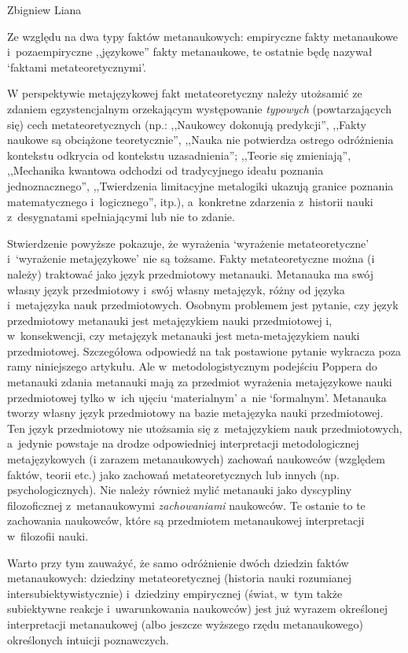 \begin{artplenv}{Zbigniew Liana}
\begin{uwaga}
Ze względu na dwa typy faktów metanaukowych: empiryczne fakty metanaukowe i~pozaempiryczne ,,językowe'' fakty metanaukowe,
te ostatnie będę nazywał `faktami metateoretycznymi'.

W perspektywie metajęzykowej fakt metateoretyczny należy utożsamić ze zdaniem egzystencjalnym orzekającym występowanie
\textit{typowych} (powtarzających się) cech metateoretycznych (np.: ,,Naukowcy dokonują predykcji'', ,,Fakty naukowe są
obciążone teoretycznie'', ,,Nauka nie potwierdza ostrego odróżnienia kontekstu odkrycia od kontekstu uzasadnienia'';
,,Teorie się zmieniają'', ,,Mechanika kwantowa odchodzi od tradycyjnego ideału poznania jednoznacznego'', ,,Twierdzenia
limitacyjne metalogiki ukazują granice poznania matematycznego i~logicznego'', itp.), a~konkretne zdarzenia z~historii
nauki z~desygnatami spełniającymi lub nie to zdanie. 

Stwierdzenie powyższe pokazuje, że wyrażenia `wyrażenie metateoretyczne' i~`wyrażenie metajęzykowe' nie są tożsame.
Fakty metateoretyczne można (i należy) traktować jako język przedmiotowy metanauki. Metanauka ma swój własny język
przedmiotowy i~swój własny metajęzyk, różny od języka i~metajęzyka nauk przedmiotowych. Osobnym problemem jest pytanie,
czy język przedmiotowy metanauki jest metajęzykiem nauki przedmiotowej i, w~konsekwencji, czy metajęzyk metanauki jest
meta-metajęzykiem nauki przedmiotowej. Szczegółowa odpowiedź na tak postawione pytanie wykracza poza ramy niniejszego
artykułu. Ale w~metodologistycznym podejściu Poppera do metanauki zdania metanauki mają za przedmiot wyrażenia
metajęzykowe nauki przedmiotowej tylko w~ich ujęciu `materialnym' a~nie `formalnym'. Metanauka tworzy własny język
przedmiotowy na bazie metajęzyka nauki przedmiotowej. Ten język przedmiotowy nie utożsamia się z~metajęzykiem nauk
przedmiotowych, a~jedynie powstaje na drodze odpowiedniej interpretacji metodologicznej metajęzykowych (i zarazem
metanaukowych) zachowań naukowców (względem faktów, teorii etc.) jako zachowań metateoretycznych lub innych (np.
psychologicznych). Nie należy również mylić metanauki jako dyscypliny filozoficznej z~metanaukowymi \textit{zachowaniami}
naukowców. Te ostanie to te zachowania naukowców, które są przedmiotem metanaukowej interpretacji w~filozofii nauki.

Warto przy tym zauważyć, że samo odróżnienie dwóch dziedzin faktów metanaukowych: dziedziny metateoretycznej (historia
nauki rozumianej intersubiektywistycznie) i~dziedziny empirycznej (świat, w~tym także subiektywne reakcje i~uwarunkowania
naukowców) jest już wyrazem określonej interpretacji metanaukowej (albo jeszcze wyższego rzędu
metanaukowego) określonych intuicji poznawczych.
\end{uwaga}


\end{artplenv}
